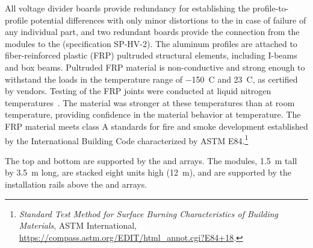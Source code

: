 All voltage divider boards provide redundancy for establishing the profile-to-profile potential differences with only minor distortions to the \efield in case of failure of any individual part, and two redundant boards provide the connection from the  modules to the  
(specification SP-HV-2).
The aluminum profiles are attached to fiber-reinforced plastic (FRP) pultruded structural elements, including I-beams and box beams.  
Pultruded FRP material is non-conductive and strong enough to withstand the  loads  in the temperature range of \SI{-150}{C} and \SI{23}{C}, as certified by vendors. Testing of the FRP joints were conducted at liquid nitrogen temperatures~\cite{bib:docdb1504}. 
The material was stronger at these temperatures than at room temperature, 
providing confidence in the material behavior at \lar  temperature. The FRP material meets class A standards for fire and smoke development established by the International Building Code characterized by ASTM E84.\footnote{\textit{Standard Test Method for Surface Burning Characteristics of Building Materials}, ASTM International, \url{https://compass.astm.org/EDIT/html_annot.cgi?E84+18}.}

The top and bottom  %
are supported by the  and  arrays. The  modules, 
\SI{1.5}{\m} tall by \SI{3.5}{\m} long, are stacked eight units high (\SI{12}{\m}), and are supported by the installation rails above the  and  arrays.


